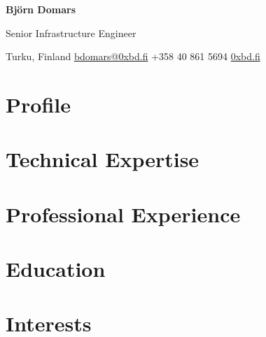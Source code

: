 \documentclass[10pt,a4paper]{article}
\begin{document}
{\Huge\bfseries Björn Domars}

\vspace{0.3em}

{\large\color{muted} Senior Infrastructure Engineer}

\vspace{0.5em}

Turku, Finland
\quad\textbullet\quad
\href{mailto:bdomars@0xbd.fi}{bdomars@0xbd.fi}
\quad\textbullet\quad
+358 40 861 5694
\quad\textbullet\quad
\href{https://0xbd.fi}{0xbd.fi}

\section{Profile}


\section{Technical Expertise}


\section{Professional Experience}


\section{Education}


%

\section{Interests}

\end{document}
